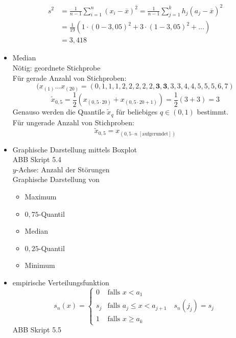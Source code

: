 \begin{itemize}
\begin{align*}
s^2 &= \frac{1}{n-1}\sum_{i=1}^n (x_i-\overline{x})^2 = \frac{1}{n-1}\sum_{j=1}^k h_j (a_j-\overline{x})^2\\
&= \frac{1}{19} (1 \cdot (0-3,05)^2 + 3 \cdot (1-3,05)^2 + \ldots)\\
&= 3,418
\end{align*}
\item Median\\
Nötig: geordnete Stichprobe\\
Für gerade Anzahl von Stichproben:
$$(x_{(1)}\ldots x_{(20)}=(0,1,1,1,2,2,2,2,2,\textbf{3},\textbf{3},3,3,4,4,5,5,5,6,7)$$
$$\tilde x _{0,5} = \frac{1}{2}(x_{(0,5\cdot 20)} + x_{(0,5\cdot 20 + 1)}) = \frac{1}{2}(3+3) = 3$$
Genauso werden die Quantile $\tilde x_q$ für beliebiges $q \in (0,1)$ bestimmt.\\
Für ungerade Anzahl von Stichproben: 
$$\tilde x_{0,5}=x_{(0,5 \cdot n\;[\mathrm{aufgerundet}])}$$
\item Graphische Darstellung mittels Boxplot\\
ABB Skript 5.4\\
$y$-Achse: Anzahl der Störungen\\
Graphische Darstellung von 
\begin{itemize}
\item Maximum
\item $0,75$-Quantil
\item Median
\item $0,25$-Quantil
\item Minimum
\end{itemize}
\item empirische Verteilungsfunktion
$$s_n(x) = \begin{cases}
0 & \text{falls }x < a_1\\
s_j & \text{falls }a_j \leq x < a_{j+1} \quad s_n(j_j) = s_j\\
1 & \text{falls }x\geq a_k
\end{cases}$$
ABB Skript 5.5
\end{itemize}

